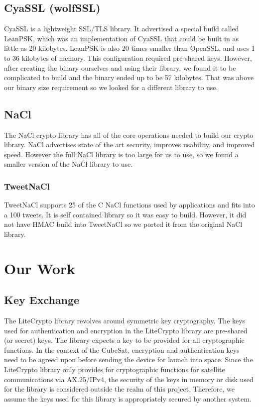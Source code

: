 \documentclass[12pt]{article}
\begin{document}
\begin{multicols}{2}
\subsection{CyaSSL (wolfSSL)}
CyaSSL is a lightweight SSL/TLS library. It advertised a special build called LeanPSK, which was an implementation of CyaSSL that could be built in as little as 20 kilobytes. LeanPSK is also 20 times smaller than OpenSSL, and uses 1 to 36 kilobytes of memory. This configuration required pre-shared keys. \cite{CyaSSL} However, after creating the binary ourselves and using their library, we found it to be complicated to build and the binary ended up to be 57 kilobytes. That was above our binary size requirement so we looked for a different library to use. 
\subsection{NaCl}
The NaCl crypto library has all of the core operations needed to build our crypto library. NaCl advertises state of the art security, improves usability, and improved speed. However the full NaCl library is too large for us to use, so we found a smaller version of the NaCl library to use. \cite{NaCl}
\subsubsection{TweetNaCl}
TweetNaCl supports 25 of the C NaCl functions used by applications and fits into a 100 tweets. It is self contained library so it was easy to build. \cite{TweetNaClPaper} However, it did not have HMAC build into TweetNaCl so we ported it from the original NaCl library. 

\section{Our Work}
\subsection{Key Exchange}

The LiteCrypto library revolves around symmetric key cryptography. The keys used for authentication and encryption in the LiteCrypto library are pre-shared (or secret) keys. The library expects a key to be provided for all cryptographic functions. In the context of the CubeSat, encryption and authentication keys need to be agreed upon before sending the device for launch into space. Since the LiteCrypto library only provides for cryptographic functions for satellite communications via AX.25/IPv4, the security of the keys in memory or disk used for the library is considered outside the realm of this project. Therefore, we assume the keys used for this library is appropriately secured by another system.


\end{multicols}
\end{document}
